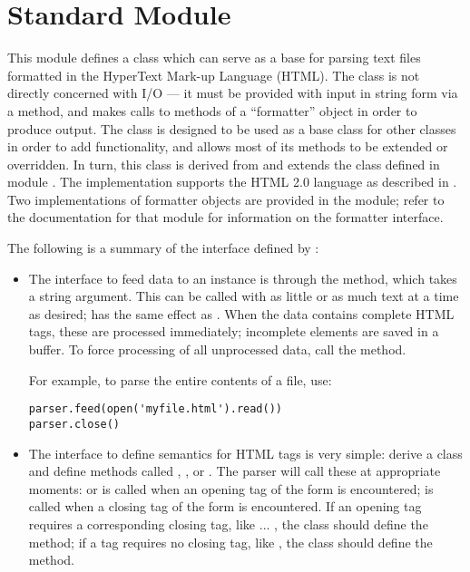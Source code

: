 \section{Standard Module }
\label{module-htmllib}


This module defines a class which can serve as a base for parsing text
files formatted in the HyperText Mark-up Language (HTML).  The class
is not directly concerned with I/O --- it must be provided with input
in string form via a method, and makes calls to methods of a
``formatter'' object in order to produce output.  The
 class is designed to be used as a base class for
other classes in order to add functionality, and allows most of its
methods to be extended or overridden.  In turn, this class is derived
from and extends the  class defined in module
.  The 
implementation supports the HTML 2.0 language as described in
.  Two implementations of formatter objects are provided in
the  module; refer to the
documentation for that module for information on the formatter
interface.

The following is a summary of the interface defined by
:

\begin{itemize}

\item
The interface to feed data to an instance is through the 
method, which takes a string argument.  This can be called with as
little or as much text at a time as desired;  has the same effect as .  When the data
contains complete HTML tags, these are processed immediately;
incomplete elements are saved in a buffer.  To force processing of all
unprocessed data, call the  method.

For example, to parse the entire contents of a file, use:
\begin{verbatim}
parser.feed(open('myfile.html').read())
parser.close()
\end{verbatim}

\item
The interface to define semantics for HTML tags is very simple: derive
a class and define methods called ,
, or .  The parser will
call these at appropriate moments:  or
 is called when an opening tag of the form
 is encountered;  is called
when a closing tag of the form  is encountered.  If
an opening tag requires a corresponding closing tag, like 
... , the class should define the 
method; if a tag requires no closing tag, like , the class
should define the  method.

\end{itemize}

